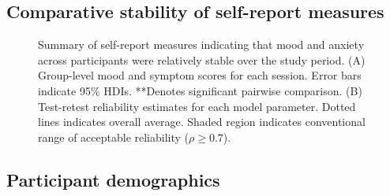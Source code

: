 \documentclass[a4paper,12pt]{article}
\begin{document}
\begin{refsection}[supp]
\clearpage
\subsection*{Comparative stability of self-report measures}

\begin{figure}[h]
    \centerline{}
    \caption{Summary of self-report measures indicating that mood and anxiety across participants were relatively stable over the study period. (A) Group-level mood and symptom scores for each session. Error bars indicate 95\% HDIs. **Denotes significant pairwise comparison. (B) Test-retest reliability estimates for each model parameter. Dotted lines indicates overall average. Shaded region indicates conventional range of acceptable reliability ($\rho \geq 0.7$).}
    \label{fig:figS05}
\end{figure}

\clearpage
\subsection*{Participant demographics}


\end{refsection}
\end{document}
